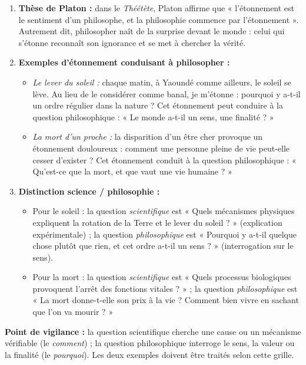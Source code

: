 \documentclass[11pt]{article}
\begin{document}
\begin{corrige}
\begin{enumerate}
\item \textbf{Thèse de Platon :} dans le \emph{Théétète}, Platon affirme que « l'étonnement est le sentiment d'un philosophe, et la philosophie commence par l'étonnement ». Autrement dit, philosopher naît de la surprise devant le monde : celui qui s'étonne reconnaît son ignorance et se met à chercher la vérité.
\item \textbf{Exemples d'étonnement conduisant à philosopher :}
\begin{itemize}
\item \emph{Le lever du soleil :} chaque matin, à Yaoundé comme ailleurs, le soleil se lève. Au lieu de le considérer comme banal, je m'étonne : pourquoi y a-t-il un ordre régulier dans la nature ? Cet étonnement peut conduire à la question philosophique : « Le monde a-t-il un sens, une finalité ? »
\item \emph{La mort d'un proche :} la disparition d'un être cher provoque un étonnement douloureux : comment une personne pleine de vie peut-elle cesser d'exister ? Cet étonnement conduit à la question philosophique : « Qu'est-ce que la mort, et que vaut une vie humaine ? »
\end{itemize}
\item \textbf{Distinction science / philosophie :}
\begin{itemize}
\item Pour le soleil : la question \emph{scientifique} est « Quels mécanismes physiques expliquent la rotation de la Terre et le lever du soleil ? » (explication expérimentale) ; la question \emph{philosophique} est « Pourquoi y a-t-il quelque chose plutôt que rien, et cet ordre a-t-il un sens ? » (interrogation sur le sens).
\item Pour la mort : la question \emph{scientifique} est « Quels processus biologiques provoquent l'arrêt des fonctions vitales ? » ; la question \emph{philosophique} est « La mort donne-t-elle son prix à la vie ? Comment bien vivre en sachant que l'on va mourir ? »
\end{itemize}
\end{enumerate}
\textbf{Point de vigilance :} la question scientifique cherche une cause ou un mécanisme vérifiable (le \emph{comment}) ; la question philosophique interroge le sens, la valeur ou la finalité (le \emph{pourquoi}). Les deux exemples doivent être traités selon cette grille.
\end{corrige}
\end{document}
